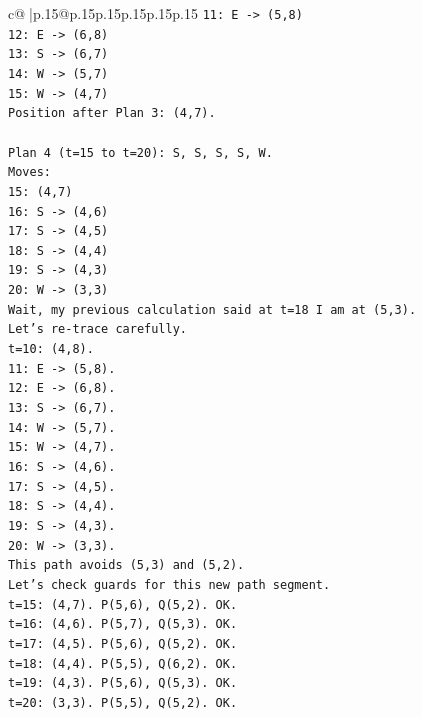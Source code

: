 \documentclass{article}
\begin{document}
{\begin{supertabular}{c@{$\;$}|p{.15\linewidth}@{}p{.15\linewidth}p{.15\linewidth}p{.15\linewidth}p{.15\linewidth}p{.15\linewidth}}
{{{\texttt{11: E {-}> (5,8)} \\
\texttt{12: E {-}> (6,8)} \\
\texttt{13: S {-}> (6,7)} \\
\texttt{14: W {-}> (5,7)} \\
\texttt{15: W {-}> (4,7)} \\
\texttt{Position after Plan 3: (4,7).} \\
\\ 
\texttt{Plan 4 (t=15 to t=20): S, S, S, S, W.} \\
\texttt{Moves:} \\
\texttt{15: (4,7)} \\
\texttt{16: S {-}> (4,6)} \\
\texttt{17: S {-}> (4,5)} \\
\texttt{18: S {-}> (4,4)} \\
\texttt{19: S {-}> (4,3)} \\
\texttt{20: W {-}> (3,3)} \\
\texttt{Wait, my previous calculation said at t=18 I am at (5,3).} \\
\texttt{Let's re{-}trace carefully.} \\
\texttt{t=10: (4,8).} \\
\texttt{11: E {-}> (5,8).} \\
\texttt{12: E {-}> (6,8).} \\
\texttt{13: S {-}> (6,7).} \\
\texttt{14: W {-}> (5,7).} \\
\texttt{15: W {-}> (4,7).} \\
\texttt{16: S {-}> (4,6).} \\
\texttt{17: S {-}> (4,5).} \\
\texttt{18: S {-}> (4,4).} \\
\texttt{19: S {-}> (4,3).} \\
\texttt{20: W {-}> (3,3).} \\
\texttt{This path avoids (5,3) and (5,2).} \\
\texttt{Let's check guards for this new path segment.} \\
\texttt{t=15: (4,7). P(5,6), Q(5,2). OK.} \\
\texttt{t=16: (4,6). P(5,7), Q(5,3). OK.} \\
\texttt{t=17: (4,5). P(5,6), Q(5,2). OK.} \\
\texttt{t=18: (4,4). P(5,5), Q(6,2). OK.} \\
\texttt{t=19: (4,3). P(5,6), Q(5,3). OK.} \\
\texttt{t=20: (3,3). P(5,5), Q(5,2). OK.} \\
}}}
\end{supertabular}}
\end{document}
